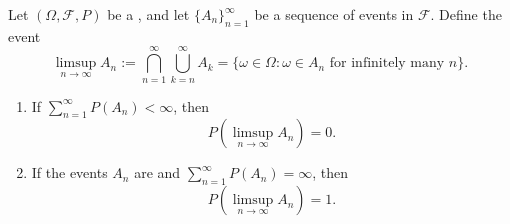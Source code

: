 \begin{lemma} \label{lemma:borel_cantelli_lemmas}
Let $(\Omega, \mathcal{F}, P)$ be a , and let $\{A_n\}_{n=1}^\infty$ be a sequence of events in $\mathcal{F}$. Define the event
$$\limsup_{n \to \infty} A_n := \bigcap_{n=1}^\infty \bigcup_{k=n}^\infty A_k = \{\omega \in \Omega : \omega \in A_n \text{ for infinitely many } n\}.$$

\begin{enumerate}
    \item [First lemma] If $\sum_{n=1}^\infty P(A_n) < \infty$, then
    $$P(\limsup_{n \to \infty} A_n) = 0.$$

    \item [Second lemma] If the events $A_n$ are  and $\sum_{n=1}^\infty P(A_n) = \infty$, then
    $$P(\limsup_{n \to \infty} A_n) = 1.$$
\end{enumerate}
\end{lemma}
